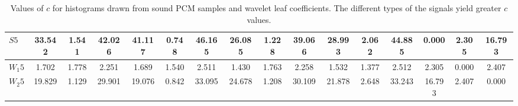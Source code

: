 \begin{table*}[h!]
\begin{center}
\begin{tabular}{| l | c | c | c | c | c | c | c | c | c | c | c | c | c | c | c |}
$S5$ & 33.542  & 1.541  & 42.026  & 41.117  & 0.748  & 46.165  & 26.085  & 1.228  & 39.066  & 28.993  & 2.062  & 44.885  & 0.000  & 2.305  & 16.793 \\\hline
$W_1 5$ & 1.702  & 1.778  & 2.251  & 1.689  & 1.540  & 2.511  & 1.430  & 1.763  & 2.258  & 1.532  & 1.377  & 2.512  & 2.305  & 0.000  & 2.407 \\\hline
$W_2 5$ & 19.829  & 1.129  & 29.901  & 19.076  & 0.842  & 33.095  & 24.678  & 1.208  & 30.109  & 21.878  & 2.648  & 33.243  & 16.793  & 2.407  & 0.000 \\\hline
\end{tabular}
\caption{Values of $c$ for histograms drawn from sound PCM samples and wavelet leaf coefficients.
The different types of the signals yield greater $c$ values.}
\end{center}
\end{table*}